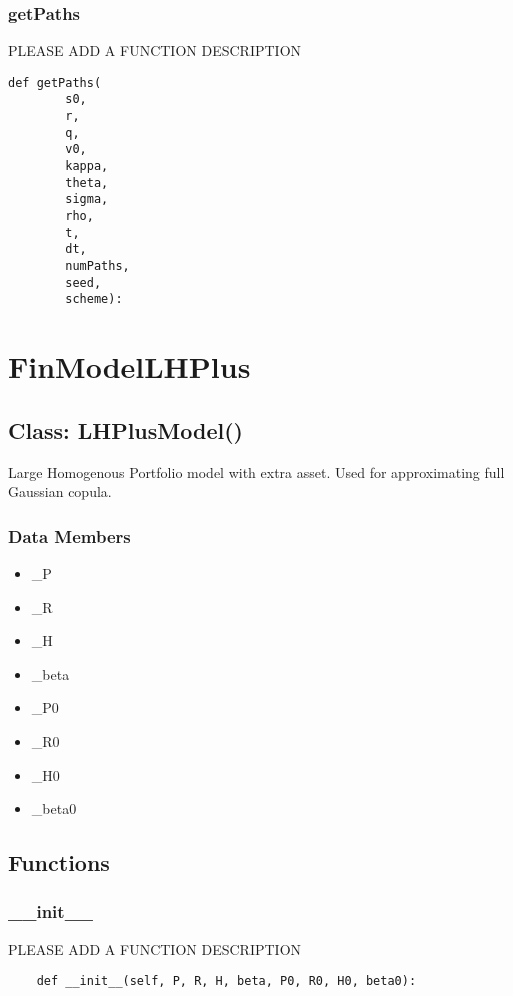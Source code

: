 \documentclass[twoside,11pt]{book}
\begin{document}
\subsubsection*{{\bf getPaths}}
PLEASE ADD A FUNCTION DESCRIPTION

\begin{lstlisting}
def getPaths(
        s0,
        r,
        q,
        v0,
        kappa,
        theta,
        sigma,
        rho,
        t,
        dt,
        numPaths,
        seed,
        scheme):
\end{lstlisting}

\newpage
\section{FinModelLHPlus}

\subsection*{Class: LHPlusModel()}
Large Homogenous Portfolio model with extra asset. Used for approximating full Gaussian copula.  

\subsubsection*{Data Members}
\begin{itemize}
\item{\_P}
\item{\_R}
\item{\_H}
\item{\_beta}
\item{\_P0}
\item{\_R0}
\item{\_H0}
\item{\_beta0}
\end{itemize}

\subsection*{Functions}

\subsubsection*{{\bf \_\_init\_\_}}
PLEASE ADD A FUNCTION DESCRIPTION

\begin{lstlisting}
    def __init__(self, P, R, H, beta, P0, R0, H0, beta0):
\end{lstlisting}
\end{document}
